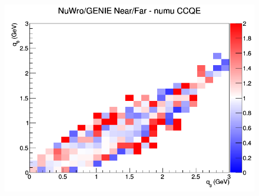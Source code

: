 \documentclass[12pt]{article}
\begin{document}
\begin{figure}[h]
\endminipage
{}
\includegraphics[width=\linewidth]{eff_q0_q3/FGT/ratios/CCQE_NuWro_GENIE_numu_NF_q3_q0.png}
\endminipage
\newline
\end{figure}
\clearpage
\end{document}
